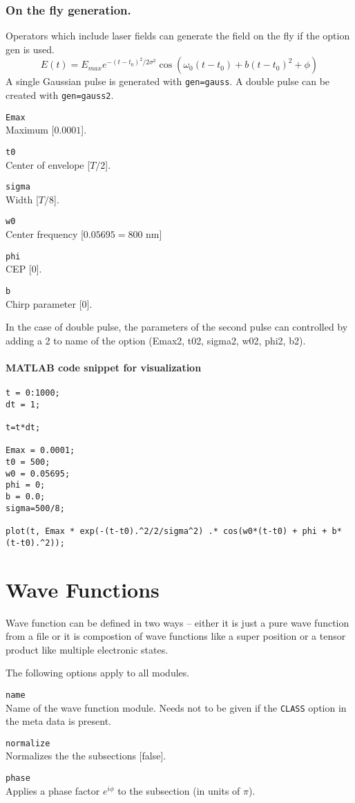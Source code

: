 \documentclass[a4paper,12pt]{scrbook}
\newcommand{\option}[2]{\item \texttt{#1}\\ #2}
\newcommand{\code}[1]{\texttt{#1}}
\begin{document}
\subsection{On the fly generation.}
Operators which include laser fields can generate the field on the fly if the option gen is used.
\begin{equation}
E(t) = E_{max} e^{-(t-t_0)^2/2\sigma^2} \cos(\omega_0 (t-t_0)+ b(t-t_0)^2+\phi) 
\end{equation}
A single Gaussian pulse is generated with \verb|gen=gauss|. A double pulse can be created with
\verb|gen=gauss2|.
\begin{options}
 \option{Emax}{Maximum [$0.0001$].}
 \option{t0}{Center of envelope [$T/2$].}
 \option{sigma}{Width [$T/8$].}
 \option{w0}{Center frequency [$0.05695 = 800$ nm]}
 \option{phi}{CEP [0].}
 \option{b}{Chirp parameter [0].}
\end{options}
In the case of double pulse, the parameters of the second pulse can controlled by adding a 2 to
name of the option (Emax2, t02, sigma2, w02, phi2, b2).

\subsubsection*{MATLAB code snippet for visualization}
\begin{verbatim}
t = 0:1000;
dt = 1;

t=t*dt;

Emax = 0.0001;
t0 = 500;
w0 = 0.05695;
phi = 0;
b = 0.0;
sigma=500/8;

plot(t, Emax * exp(-(t-t0).^2/2/sigma^2) .* cos(w0*(t-t0) + phi + b*(t-t0).^2)); 
\end{verbatim}


\chapter{Wave Functions}
Wave function can be defined in two ways -- either it is just a pure wave function from a
file or it is compostion of wave functions like a super position or a tensor product like
multiple electronic states.

The following options apply to all modules.
\begin{options}
 \option{name}{Name of the wave function module. Needs not to be given if the \code{CLASS} option in the meta data is present.}
 \option{normalize}{Normalizes the the subsections [false].}
 \option{phase}{Applies a phase factor $e^{i\phi}$ to the subsection (in units of $\pi$).}
\end{options}
\end{document}
